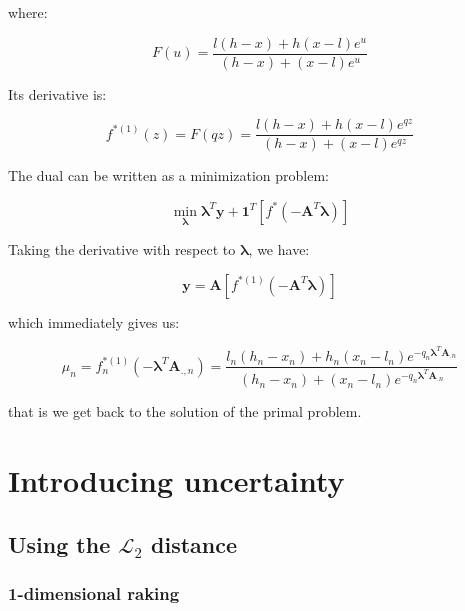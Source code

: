 \documentclass{tex/note}
\begin{document}
where:

\begin{equation*}
F \left( u \right) = \frac{l \left( h - x \right) + h \left( x - l \right) e^u}{\left( h - x \right) + \left( x - l \right) e^u}
\end{equation*}

Its derivative is:

\begin{equation*}
f^{* \left( 1 \right)} \left( z \right) = F \left( q z \right) = \frac{l \left( h - x \right) + h \left( x - l \right) e^{qz}}{\left( h - x \right) + \left( x - l \right) e^{qz}}
\end{equation*}

The dual can be written as a minimization problem:

\begin{equation*}
\min_{\bm{\lambda}} \bm{\lambda}^T \bm{y} + \bm{1}^T \left[ f^* \left( - \bm{A}^T \bm{\lambda} \right) \right] 
\end{equation*}

Taking the derivative with respect to $\bm{\lambda}$, we have:

\begin{equation*}
\bm{y} = \bm{A} \left[ f^{* \left( 1 \right)} \left( - \bm{A}^T \bm{\lambda} \right) \right]
\end{equation*}

which immediately gives us:

\begin{equation*}
\mu_n = f_n^{* \left( 1 \right)} \left( - \bm{\lambda}^T \bm{A}_{.,n} \right) = \frac{l_n \left( h_n - x_n \right) + h_n \left( x_n - l_n \right) e^{- q_n \bm{\lambda}^T \bm{A}_{.n}}}{\left( h_n - x_n \right) + \left( x_n - l_n \right) e^{- q_n \bm{\lambda}^T \bm{A}_{.n}}}
\end{equation*}

that is we get back to the solution of the primal problem.

\section{Introducing uncertainty}

\subsection{Using the $\mathcal{L}_2$ distance}

\subsubsection{1-dimensional raking}
\end{document}
